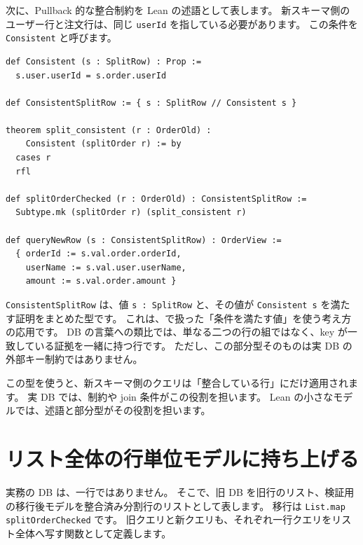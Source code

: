 次に、Pullback 的な整合制約を Lean の述語として表します。
新スキーマ側のユーザー行と注文行は、同じ \texttt{userId} を指している必要があります。
この条件を \texttt{Consistent} と呼びます。

\begin{listing}[htbp]
\begin{verbatim}
def Consistent (s : SplitRow) : Prop :=
  s.user.userId = s.order.userId

def ConsistentSplitRow := { s : SplitRow // Consistent s }

theorem split_consistent (r : OrderOld) :
    Consistent (splitOrder r) := by
  cases r
  rfl

def splitOrderChecked (r : OrderOld) : ConsistentSplitRow :=
  Subtype.mk (splitOrder r) (split_consistent r)

def queryNewRow (s : ConsistentSplitRow) : OrderView :=
  { orderId := s.val.order.orderId,
    userName := s.val.user.userName,
    amount := s.val.order.amount }
\end{verbatim}
\caption{\texttt{ConsistentSplitRow}}
\label{lst:ch32-consistency}
\end{listing}

\texttt{ConsistentSplitRow} は、値 \texttt{s : SplitRow} と、その値が \texttt{Consistent s} を満たす証明をまとめた型です。
これは、で扱った「条件を満たす値」を使う考え方の応用です。
DB の言葉への類比では、単なる二つの行の組ではなく、key が一致している証拠を一緒に持つ行です。
ただし、この部分型そのものは実 DB の外部キー制約ではありません。

この型を使うと、新スキーマ側のクエリは「整合している行」にだけ適用されます。
実 DB では、制約や join 条件がこの役割を担います。
Lean の小さなモデルでは、述語と部分型がその役割を担います。

\section{リスト全体の行単位モデルに持ち上げる}

実務の DB は、一行ではありません。
そこで、旧 DB を旧行のリスト、検証用の移行後モデルを整合済み分割行のリストとして表します。
移行は \texttt{List.map splitOrderChecked} です。
旧クエリと新クエリも、それぞれ一行クエリをリスト全体へ写す関数として定義します。

